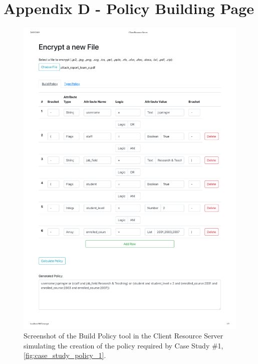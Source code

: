 \begin{appendices}
\begin{figure}
\end{figure}

\section{Appendix D - Policy Building Page}
\label{appendix:policy_building}

\begin{figure}
    \centering
    \includegraphics[width=\linewidth,keepaspectratio]{appendices/building_policy.pdf}

    \caption{
      \label{fig:policy_builder}
      Screenshot of the Build Policy tool in the Client Resource Server simulating the creation of the policy required by Case Study \#1, \cref{fig:case_study_policy_1}.
    }

\end{figure}

\end{appendices}
